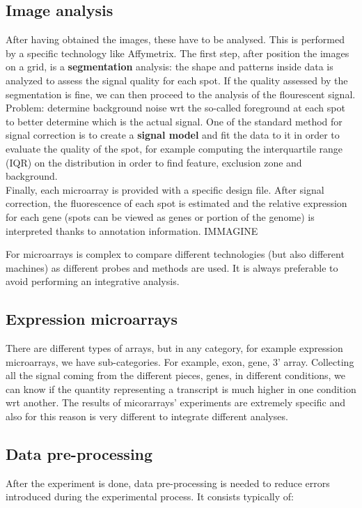 	\subsection{Image analysis}
	After having obtained the images, these have to be analysed.
	This is performed by a specific technology like Affymetrix.
	The first step, after position the images on a grid, is a \textbf{segmentation} analysis: the shape and patterns inside data is analyzed to assess the signal quality for each spot.
	If the quality assessed by the segmentation is fine, we can then proceed to the analysis of the flourescent signal.
	Problem: determine background noise wrt the so-called foreground at each spot to better determine which is the actual signal.
	One of the standard method for signal correction is to create a \textbf{signal model} and fit the data to it in order to evaluate the quality of the spot, for example computing the interquartile range (IQR) on the distribution in order to find feature, exclusion zone and background.
	\\
	Finally, each microarray is provided with a specific design file. 
	After signal correction, the fluorescence of each spot is estimated and the relative expression for each gene (spots can be viewed as genes or portion of the genome) is interpreted thanks to annotation information.
	IMMAGINE

	For microarrays is complex to compare different technologies (but also different machines) as different probes and methods are used.
	It is always preferable to avoid performing an integrative analysis.

	\subsection{Expression microarrays}
	There are different types of arrays, but in any category, for example expression microarrays, we have sub-categories. For example, exon, gene, 3' array. 
	Collecting all the signal coming from the different pieces, genes, in different conditions, we can know if the quantity representing a transcript is much higher in one condition wrt another.
	The results of micorarrays' experiments are extremely specific and also for this reason is very different to integrate different analyses.

	\subsection{Data pre-processing}
	After the experiment is done, data pre-processing is needed to reduce errors introduced during the experimental process.
	It consists typically of: 

